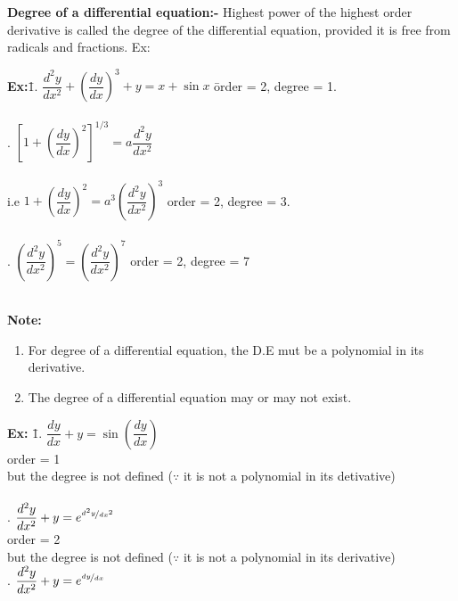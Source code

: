 \documentclass[a4paper, titlepage]{article}
\begin{document}
    \medskip
    \noindent\textbf{Degree of a differential equation:-} Highest power of the highest order derivative is called the degree of the differential equation, provided it is free from radicals and fractions.
    Ex:
    \begin{tabbing}
        \textbf{Ex:}\hspace{1em}\= 1. $ \dfrac{d^2y}{dx^2} + \left( \dfrac{dy}{dx} \right)^3 + y = x + \sin x $ \hspace{2em}\= order = 2, degree = 1. \\ \\
        . $\left[ 1 + \left( \dfrac{dy}{dx} \right)^2 \right]^{1/3} = a\dfrac{d^2y}{dx^2}$ \\ \\
        \> \hspace{1em} i.e $1 + \left( \dfrac{dy}{dx} \right)^2 = a^3 \left( \dfrac{d^2y}{dx^2} \right)^3$ \> order = 2, degree = 3. \\ \\
        . $ \left( \dfrac{d^2y}{dx^2} \right)^5 = \left( \dfrac{d^2y}{dx^2} \right)^7 $ \> order = 2, degree = 7 \\ \\
    \end{tabbing}
    \textbf{Note:}
    \begin{enumerate}[label=\roman*, leftmargin=3em]
        \item For degree of a differential equation, the D.E mut be a 
        polynomial in its derivative.
        \item The degree of a differential equation may or may not exist.
    \end{enumerate}
    \begin{tabbing}
        \textbf{Ex:} \= 1. $ \dfrac{dy}{dx} + y = \sin \left( \dfrac{dy}{dx} \right) $ \\
            \> order = 1 \\
            \> but the degree is not defined ($\because$ it is not a polynomial 
            in its detivative) \\ \\
            . $ \dfrac{d^2y}{dx^2} + y = e^{\nicefrac{d^2y}{dx^2}} $ \\
            \> order = 2 \\
            \> but the degree is not defined ($\because$ it is not a polynomial
            in its derivative) \\
            . $ \dfrac{d^2y}{dx^2} + y = e^{\nicefrac{dy}{dx}} $ 
    \end{tabbing}
\end{document}
